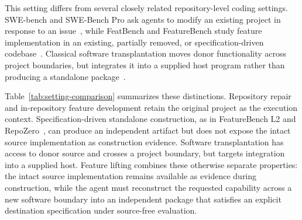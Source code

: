 \documentclass[acmsmall,screen,review,anonymous]{acmart}
\begin{document}
This setting differs from several closely related repository-level coding
settings. SWE-bench and SWE-Bench Pro ask agents to modify an existing project
in response to an issue~\cite{jimenez2024swebench,deng2025swebenchpro}, while
FeatBench and FeatureBench study feature implementation in an existing,
partially removed, or specification-driven codebase~\cite{chen2026featbench,zhou2026featurebench}.
Classical software transplantation moves donor functionality across project
boundaries, but integrates it into a supplied host program rather than producing
a standalone package~\cite{barr2015transplantation}.

Table~\ref{tab:setting-comparison} summarizes these distinctions. Repository
repair and in-repository feature development retain the original project as the
execution context. Specification-driven standalone construction, as in
FeatureBench L2 and RepoZero~\cite{zhang2026repozero}, can produce an independent
artifact but does not expose the intact source implementation as construction
evidence. Software transplantation has access to donor source and crosses a
project boundary, but targets integration into a supplied host.
Feature lifting combines these otherwise separate properties: the intact source
implementation remains available as evidence during construction, while the
agent must reconstruct the requested capability across a new software boundary
into an independent package that satisfies an explicit destination
specification under source-free evaluation.
\end{document}
